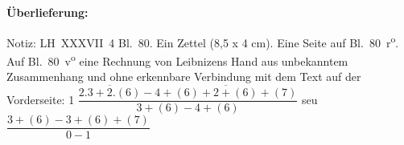 %
%
%
%
%
\frenchspacing%
\begin{ledgroupsized}[r]{120mm}
\footnotesize
\pstart
\noindent\textbf{Überlieferung:}
\pend
\end{ledgroupsized}
\begin{ledgroupsized}[r]{114mm}
\footnotesize
\pstart \parindent -6mm
%
Notiz:
LH~XXXVII~4 Bl.~80.
Ein Zettel (8,5 x 4 cm).
Eine Seite auf Bl.~80~r\textsuperscript{o}.
Auf Bl.~80~v\textsuperscript{o} eine Rechnung von Leibnizens Hand aus unbekanntem Zusammenhang und ohne erkennbare Verbindung mit dem Text auf der Vorderseite:
\newline%
%
1         
\newline%
%
$\dfrac{\overline{2.3 + 2.(6)}-\overline{4+(6)+2+(6)+(7)}}{3+(6)-4+(6)}$ seu $\dfrac{3+(6)-3+(6)+(7)}{0-1}$
\pend
\end{ledgroupsized}
%
\vspace{5mm}%
